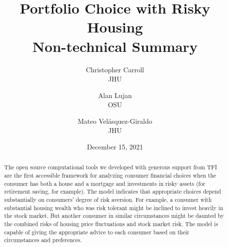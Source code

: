 \documentclass[PortfolioChoiceWithRiskyHousing]{subfiles}
\begin{document}
\renewcommand{\texname}{NontechSum}
	\author{
		{\small Christopher Carroll} \\ {\small JHU}
		\and
		{\small Alan Lujan} \\ {\small OSU}
		\and
		{\small Mateo Vel\'asquez-Giraldo} \\ {\small JHU}
	}


\title{Portfolio Choice with Risky Housing \\ Non-technical Summary}
\renewcommand{\forcedate}{December 15, 2021}\date{\forcedate}

\renewcommand{\onlyinsubfile}[1]{}\renewcommand{\notinsubfile}[1]{#1}

\hypertarget{Non-technical Summary}{}
\maketitle

\begin{abstract}
	The open source computational tools we developed with generous support from TFI are the first accessible framework for analyzing consumer financial choices when the consumer has both a house and a mortgage and investments in risky assets (for retirement saving, for example). The model indicates that appropriate choices depend substantially on consumers' degree of risk aversion. For example, a consumer with substantial housing wealth who was risk tolerant might be inclined to invest heavily in the stock market. But another consumer in similar circumstances might be daunted by the combined risks of housing price fluctuations and stock market risk. The model is capable of giving the appropriate advice to each consumer based on their circumstances and preferences.
\end{abstract}










\clearpage\vfill\eject

\normalsize

\pagebreak

\end{document}
